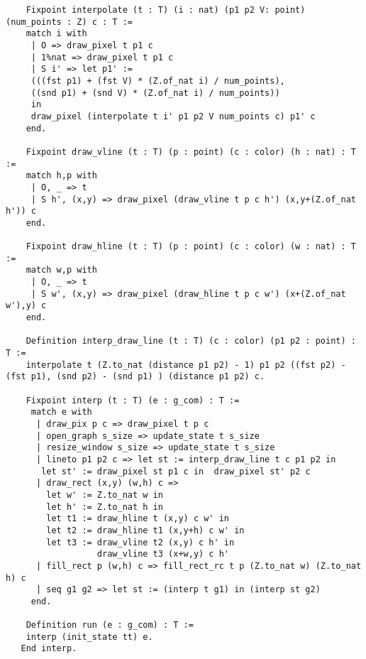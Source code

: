 \documentclass{llncs}
\begin{document}
 \begin{lstlisting}
    Fixpoint interpolate (t : T) (i : nat) (p1 p2 V: point) (num_points : Z) c : T :=
    match i with
     | O => draw_pixel t p1 c
     | 1%nat => draw_pixel t p1 c
     | S i' => let p1' :=
     (((fst p1) + (fst V) * (Z.of_nat i) / num_points),
     ((snd p1) + (snd V) * (Z.of_nat i) / num_points))
     in
     draw_pixel (interpolate t i' p1 p2 V num_points c) p1' c 
    end.

    Fixpoint draw_vline (t : T) (p : point) (c : color) (h : nat) : T :=
    match h,p with
     | O, _ => t
     | S h', (x,y) => draw_pixel (draw_vline t p c h') (x,y+(Z.of_nat h')) c
    end.

    Fixpoint draw_hline (t : T) (p : point) (c : color) (w : nat) : T :=
    match w,p with
     | O, _ => t
     | S w', (x,y) => draw_pixel (draw_hline t p c w') (x+(Z.of_nat w'),y) c
    end.

    Definition interp_draw_line (t : T) (c : color) (p1 p2 : point) : T :=
    interpolate t (Z.to_nat (distance p1 p2) - 1) p1 p2 ((fst p2) - (fst p1), (snd p2) - (snd p1) ) (distance p1 p2) c.

    Fixpoint interp (t : T) (e : g_com) : T :=
     match e with
      | draw_pix p c => draw_pixel t p c
      | open_graph s_size => update_state t s_size
      | resize_window s_size => update_state t s_size 
      | lineto p1 p2 c => let st := interp_draw_line t c p1 p2 in 
       let st' := draw_pixel st p1 c in  draw_pixel st' p2 c
      | draw_rect (x,y) (w,h) c =>
        let w' := Z.to_nat w in
        let h' := Z.to_nat h in
        let t1 := draw_hline t (x,y) c w' in
        let t2 := draw_hline t1 (x,y+h) c w' in
        let t3 := draw_vline t2 (x,y) c h' in
                  draw_vline t3 (x+w,y) c h'
      | fill_rect p (w,h) c => fill_rect_rc t p (Z.to_nat w) (Z.to_nat h) c
      | seq g1 g2 => let st := (interp t g1) in (interp st g2)
     end.

    Definition run (e : g_com) : T :=
    interp (init_state tt) e.
   End interp.
 \end{lstlisting}




\end{document}
